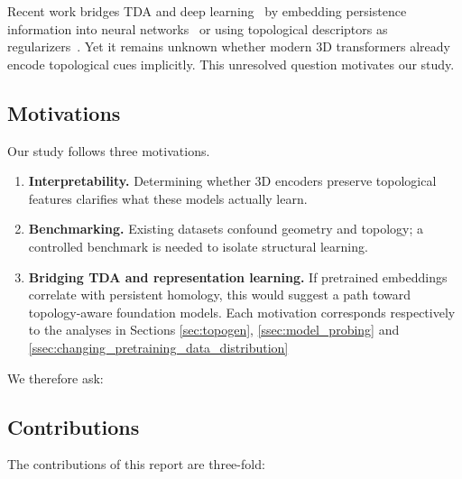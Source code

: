 Recent work bridges TDA and deep learning~\cite{optimizing_persistent_homology, persistent_homology_seg, } by embedding persistence information into neural networks~\cite{neural_approximation_graph_topological_features} or using topological descriptors as regularizers~\cite{topological_autoencoders,top_layers,topology_activations,top_reg}. Yet it remains unknown whether modern 3D transformers already encode topological cues implicitly. This unresolved question motivates our study.

\subsection{Motivations}

Our study follows three motivations.

\begin{enumerate}
    \item \textbf{Interpretability.} Determining whether 3D encoders preserve topological features clarifies what these models actually learn.
    \item \textbf{Benchmarking.} Existing datasets confound geometry and topology; a controlled benchmark is needed to isolate structural learning.
    \item \textbf{Bridging TDA and representation learning.} If pretrained embeddings correlate with persistent homology, this would suggest a path toward topology-aware foundation models. Each motivation corresponds respectively to the analyses in Sections \ref{sec:topogen}, \ref{ssec:model_probing} and \ref{ssec:changing_pretraining_data_distribution}
\end{enumerate}

We therefore ask:

\begin{center}
\end{center}

\subsection{Contributions}

The contributions of this report are three-fold:

